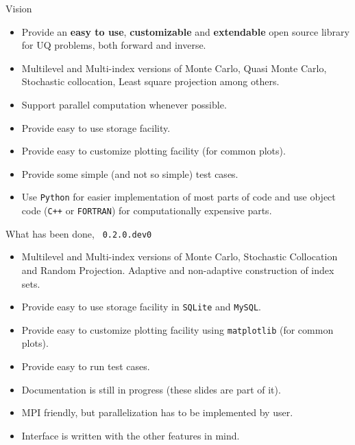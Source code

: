\begin{frame}{Vision}
  \begin{itemize}
  \item Provide an \textbf{easy to use}, \textbf{customizable} and
    \textbf{extendable} open source library for UQ problems, both
    forward and inverse.
  \item Multilevel and Multi-index versions of Monte Carlo, Quasi Monte
    Carlo, Stochastic collocation, Least square projection among
    others.
  \item Support parallel computation whenever possible.
  \item Provide easy to use storage facility.
  \item Provide easy to customize plotting facility (for common
    plots).
  \item Provide some simple (and not so simple) test cases.
  \item Use \texttt{Python} for easier implementation of most parts of code
    and use object code (\texttt{C++} or \texttt{FORTRAN}) for
    computationally expensive parts.
  \end{itemize}
\end{frame}

\begin{frame}{What has been done, \lib~\texttt{0.2.0.dev0}}
  \begin{itemize}
  \item Multilevel and Multi-index versions of Monte Carlo, Stochastic
    Collocation and Random Projection. Adaptive and non-adaptive
    construction of index sets.
  \item Provide easy to use storage facility in \texttt{SQLite} and \texttt{MySQL}.
  \item Provide easy to customize plotting facility using \texttt{matplotlib} (for common
    plots).
  \item Provide easy to run test cases.
  \item Documentation is still in progress (these slides are part of
    it).
  \item MPI friendly, but parallelization has to be implemented by
    user.
  \item Interface is written with the other features in mind.
  \end{itemize}
\end{frame}

